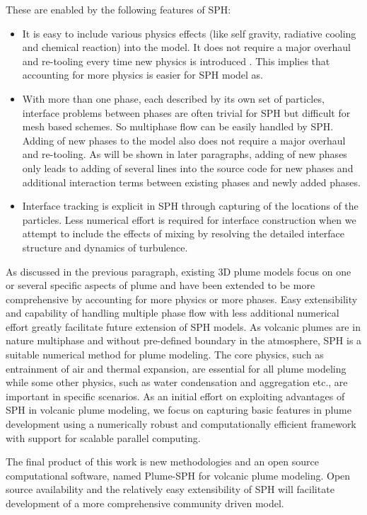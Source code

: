 These are enabled by the following features of SPH:
\begin{itemize}
\item It is easy to include various physics effects (like self gravity, radiative cooling and chemical reaction) into the model. It does not require a major overhaul and re-tooling every time new physics is introduced \citep{monaghan1995sph}. This implies that accounting for more physics is easier for SPH model as.
\item With more than one phase, each described by its own set of particles, interface problems between phases are often trivial for SPH but difficult for mesh based schemes. So multiphase flow can be easily handled by SPH. Adding of new phases to the model also does not require a major overhaul and re-tooling. As will be shown in later paragraphs, adding of new phases only leads to adding of several lines into the source code for new phases and additional interaction terms between existing phases and newly added phases.
\item Interface tracking is explicit in SPH through capturing of the locations of the particles. Less numerical effort is required for interface construction when we attempt to include the effects of mixing by resolving the detailed interface structure and dynamics of turbulence.
\end{itemize}

As discussed in the previous paragraph, existing 3D plume models focus on one or several specific aspects of plume and have been extended to be more comprehensive by accounting for more physics or more phases. Easy extensibility and capability of handling multiple phase flow with less additional numerical effort greatly facilitate future extension of SPH models. As volcanic plumes are in nature multiphase and without pre-defined boundary in the atmosphere, SPH is a suitable numerical method for plume modeling. The core physics, such as entrainment of air and thermal expansion, are essential for all plume modeling while some other physics, such as water condensation and aggregation etc., are important in specific scenarios. As an initial effort on exploiting advantages of SPH in volcanic plume modeling, we focus on capturing basic features in plume development using a numerically robust and computationally efficient framework with support for scalable parallel computing. %

The final product of this work is new methodologies and an open source computational software, named Plume-SPH for volcanic plume modeling. Open source availability and the relatively easy extensibility of SPH will facilitate development of a more comprehensive community driven model.

